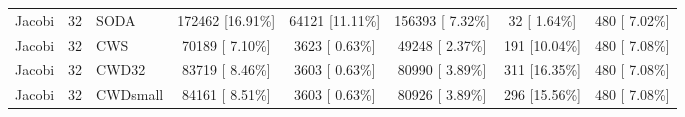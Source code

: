 \begin{table}
\begin{tabular*}{\textwidth}{ l c l c c c c c}
 \hline
 
 Jacobi & 32 & SODA &  172462 [16.91\%] &  64121 [11.11\%] &  156393 [ 7.32\%] &   32 [ 1.64\%] &     480 [ 7.02\%] \\
 Jacobi & 32 & CWS &  70189 [ 7.10\%] &   3623 [ 0.63\%] &   49248 [ 2.37\%] &  191 [10.04\%] &   480 [ 7.08\%] \\
 Jacobi & 32 & CWD32 &  83719 [ 8.46\%] &   3603 [ 0.63\%] &   80990 [ 3.89\%] &  311 [16.35\%] &    480 [ 7.08\%] \\
 Jacobi & 32 & CWDsmall &  84161 [ 8.51\%] &   3603 [ 0.63\%] &   80926 [ 3.89\%] &  296 [15.56\%] &   480 [ 7.08\%] \\
 

\end{tabular*}
\end{table}

